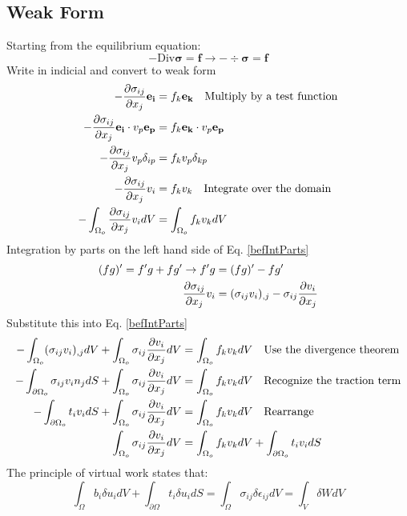 \documentclass[12pt,3p]{article}
\begin{document}
\subsection{Weak Form}
Starting from the equilibrium equation:
\begin{equation}
- \text{Div} \bm{\sigma} = \bm{f} \rightarrow - \div \bm{\sigma} = \bm{f} 
\end{equation}
Write in indicial and convert to weak form 
\begin{align}\label{befIntParts}
\begin{split}
- \pdv{\sigma_{ij}}{x_j} \mathbf{e_i} &= f_k \mathbf{e_k} \quad \text{Multiply by a test function} \\
-\pdv{\sigma_{ij}}{x_j} \mathbf{e_i} \cdot v_p \mathbf{e_p} &= f_k \mathbf{e_k} \cdot v_p \mathbf{e_p} \\
-\pdv{\sigma_{ij}}{x_j} v_p \delta_{ip} &= f_k v_p \delta_{kp} \\
-\pdv{\sigma_{ij}}{x_j} v_i &= f_k v_k \quad \text{Integrate over the domain} \\
-\int_{\Omega_o} \pdv{\sigma_{ij}}{x_j} v_i dV &= \int_{\Omega_o} f_k v_k dV
\end{split}
\end{align}
Integration by parts on the left hand side of Eq. \ref{befIntParts}
\begin{align*}
(fg)' = f'g + fg' \rightarrow f'g &= (fg)' - fg' \\
\pdv{\sigma_{ij}}{x_j} v_i &= (\sigma_{ij} v_i)_{,j} - \sigma_{ij} \pdv{v_i}{x_j}
\end{align*}
Substitute this into Eq. \ref{befIntParts}
\begin{align*}
-\int_{\Omega_o}  (\sigma_{ij} v_i)_{,j} dV + \int_{\Omega_o} \sigma_{ij} \pdv{v_i}{x_j} dV &= \int_{\Omega_o} f_k v_k dV \quad \text{Use the divergence theorem} \\
-\int_{\partial \Omega_o} \sigma_{ij} v_i n_j dS + \int_{\Omega_o} \sigma_{ij} \pdv{v_i}{x_j} dV &= \int_{\Omega_o} f_k v_k dV \quad \text{Recognize the traction term} \\
-\int_{\partial \Omega_o} t_i v_i dS + \int_{\Omega_o} \sigma_{ij} \pdv{v_i}{x_j} dV &= \int_{\Omega_o} f_k v_k dV \quad \text{Rearrange}\\
 \int_{\Omega_o} \sigma_{ij} \pdv{v_i}{x_j}  dV &= \int_{\Omega_o} f_k v_k dV + \int_{\partial \Omega_o} t_i v_i dS
\end{align*}
The principle of virtual work states that:
\begin{equation}\label{PVW}
\int_{\Omega} b_i \delta u_i dV + \int_{\partial \Omega} t_i \delta u_i dS  = \int_{\Omega} \sigma_{ij} \delta \epsilon_{ij} dV = \int_{V} \delta W dV
\end{equation}
\end{document}
